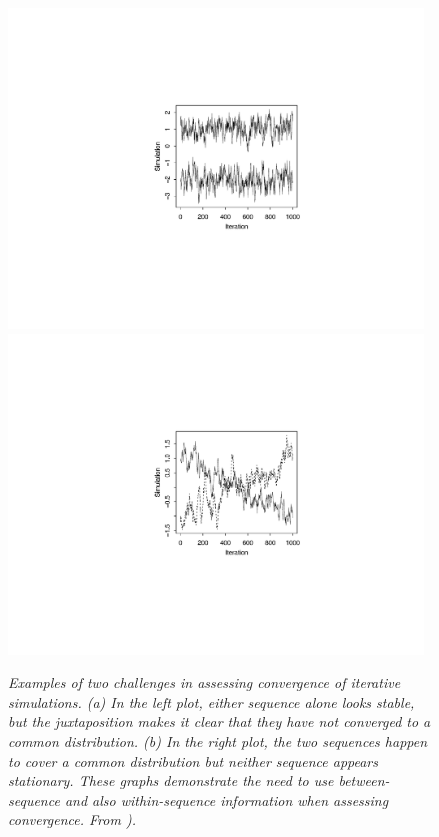 \documentclass[american,]{article}
\begin{document}
\begin{figure}
\vspace{-.22\textwidth}
\centerline{\hspace{-.1\textwidth}
\includegraphics[width=0.98\textwidth]{graphics/convergechallenge1.pdf}
\hspace{-.5\textwidth}
\includegraphics[width=0.98\textwidth]{graphics/convergechallenge2.pdf}}
\vspace{-.22\textwidth}
\caption{\em Examples of two challenges in assessing convergence of iterative
simulations. (a) In the left plot, either sequence alone looks stable, but the
juxtaposition makes it clear that they have not converged to a common
distribution. (b) In the right plot, the two sequences happen to cover a common
distribution but neither sequence appears stationary. These graphs demonstrate
the need to use between-sequence and also within-sequence information when
assessing convergence. From \citet{BDA3}).}
\label{converge.challenge}
\end{figure}
\end{document}
